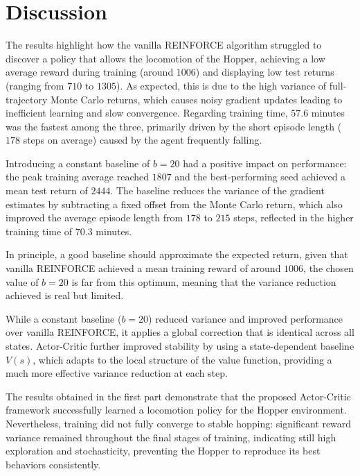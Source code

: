 \section{Discussion}

The results highlight how the vanilla REINFORCE algorithm struggled to 
discover a policy that allows the locomotion of the Hopper, achieving a 
low average reward during training (around $1006$) and displaying low test 
returns (ranging from $710$ to $1305$). As expected, this is due to the high 
variance of full-trajectory Monte Carlo returns, which causes noisy gradient 
updates leading to inefficient learning and slow convergence. Regarding 
training time, $57.6$ minutes was the fastest among the three, primarily 
driven by the short episode length ($178$ steps on average) caused by the 
agent frequently falling.

Introducing a constant baseline of $b{=}20$ had a positive impact on 
performance: the peak training average reached $1807$ and the best-performing 
seed achieved a mean test return of $2444$. The baseline reduces the variance 
of the gradient estimates by subtracting a fixed offset from the Monte Carlo 
return, which also improved the average episode length from $178$ to $215$ 
steps, reflected in the higher training time of $70.3$ minutes. 

In principle, 
a good baseline should approximate the expected return, given that vanilla 
REINFORCE achieved a mean training reward of around $1006$, the chosen value 
of $b{=}20$ is far from this optimum, meaning that the variance reduction 
achieved is real but limited.


While a constant baseline ($b=20$) reduced variance and improved performance over vanilla REINFORCE, it applies a global correction that is identical across all states. Actor-Critic further improved stability by using a state-dependent baseline $V(s)$, which adapts to the local structure of the value function, providing a much more effective variance reduction at each step.



The results obtained in the first part demonstrate that the proposed Actor-Critic framework successfully learned a locomotion policy for the Hopper environment.
Nevertheless, training did not fully converge to stable hopping: significant reward variance remained throughout the final stages of training, 
indicating still high exploration and stochasticity, preventing the Hopper to reproduce its best behaviors consistently.


